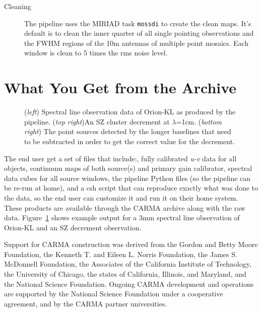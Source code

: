 \begin{description}
\begin{description}
\item[Cleaning] The pipeline uses the MIRIAD task \verb#mossdi# to create the clean maps. It's default is to clean the inner quarter of all single pointing observations and the FWHM regions of the 10m antennas of multiple point mosaics. Each window is clean to 5 times the rms noise level.
\end{description}
\end{description}

\section{What You Get from the Archive}
\begin{figure}[!ht]
\end{figure}
\begin{figure}[!ht]
\caption{(\textit{left}) Spectral line observation data of Orion-KL as produced by the pipeline. (\textit{top right})An SZ cluster decrement at $\lambda$=1cm. (\textit{bottom right}) The point sources detected by the longer baselines that need to be subtracted in order to get the correct value for the decrement.\label{fig:SZD}}
\end{figure}
\begin{figure}[!ht]
\end{figure}
The end user get a set of files that include:, fully calibrated \textit{u-v} data for all objects, continuum maps of both source(s) and primary gain calibrator, spectral data cubes for all source windows, the pipeline Python files (so the pipeline can be re-run at home), and a csh script that can reproduce exactly what was done to the data, so the end user can customize it and run it on their home system. These products are available through the CARMA archive along with the raw data. Figure~\ref{fig:SZD} shows example output for a 3mm spectral line observation of Orion-KL and an SZ decrement observation.

\acknowledgements Support for CARMA construction was derived from the Gordon and Betty Moore Foundation, the Kenneth T. and Eileen L. Norris Foundation, the James S. McDonnell Foundation, the Associates of the California Institute of Technology, the University of Chicago, the states of California, Illinois, and Maryland, and the National Science Foundation. Ongoing CARMA development and operations are supported by the National Science Foundation under a cooperative agreement, and by the CARMA partner universities.



